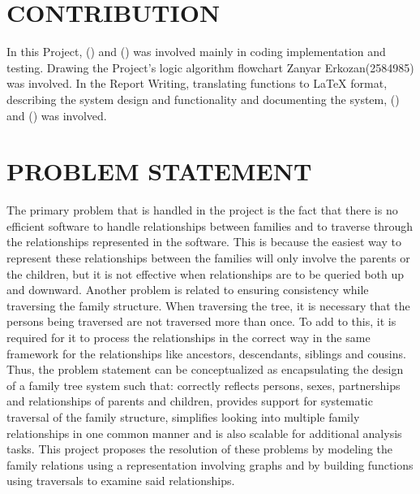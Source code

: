 \documentclass[
]{article}
\begin{document}
\section{CONTRIBUTION}\label{contribution} In this Project, () and ()
was involved mainly in coding implementation and testing. Drawing the Project's logic algorithm flowchart Zanyar Erkozan(2584985)
was involved. In the Report Writing, translating functions to LaTeX format, describing
the system design and functionality and documenting the system, () and () was involved. \newpage %
\section{PROBLEM STATEMENT}\label{problem-statement} The primary problem that is handled in the project is the fact that
there is no efficient software to handle relationships between families
and to traverse through the relationships represented in the software.
This is because the easiest way to represent these relationships between
the families will only involve the parents or the children, but it is
not effective when relationships are to be queried both up and downward. Another problem is related to ensuring consistency while traversing the
family structure. When traversing the tree, it is necessary that the
persons being traversed are not traversed more than once. To add to
this, it is required for it to process the relationships in the correct
way in the same framework for the relationships like ancestors,
descendants, siblings and cousins. Thus, the problem statement can be conceptualized as encapsulating the
design of a family tree system such that: correctly reflects persons,
sexes, partnerships and relationships of parents and children, provides
support for systematic traversal of the family structure, simplifies
looking into multiple family relationships in one common manner and is
also scalable for additional analysis tasks. This project proposes the resolution of these problems by modeling the
family relations using a representation involving graphs and by building
functions using traversals to examine said relationships. \newpage %
\end{document}
